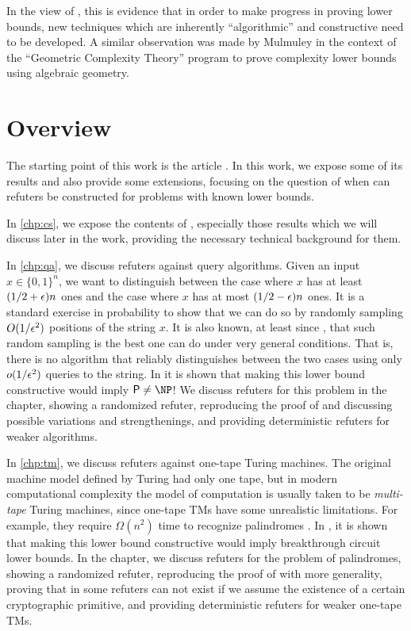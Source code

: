 In the view of \cite{ConstructiveSeparations}, this is evidence that in order to make progress
in proving lower bounds, new techniques which are inherently ``algorithmic'' 
and constructive need to be developed. A similar observation was made by Mulmuley 
\cite{Mulmuley10} in the context of the ``Geometric Complexity Theory'' program 
to prove complexity lower bounds using algebraic geometry. 

\section{Overview}

The starting point of this work is the article \cite{ConstructiveSeparations}. In this work,
we expose some of its results and also provide some extensions, focusing on the question of
when can refuters be constructed for problems with known lower bounds.

In \cref{chp:cs}, we expose the contents of \cite{ConstructiveSeparations}, especially those
results which we will discuss later in the work, providing the necessary technical background 
for them. 

In \cref{chp:qa}, we discuss refuters against query algorithms. 
Given an input $x \in \{0, 1\}^n$, we want to distinguish between the case where $x$ has at
least $(1/2 + \epsilon)n$ ones and the case where $x$ has at most $(1/2 - \epsilon)n$ ones. 
It is a standard exercise in probability to show that we can do so by randomly sampling $O(1/\epsilon^2)$
positions of the string $x$. It is also known, at least since \cite{Canetti95}, that such
random sampling is the best one can do under very general conditions. That is, there is no
algorithm that reliably distinguishes between the two cases using only $o(1/\epsilon^2)$ queries
to the string. In \cite{ConstructiveSeparations} it is shown that making this lower bound
constructive would imply $\PTIME \neq \NP$! We discuss refuters for this
problem in the chapter, showing a 
randomized refuter, reproducing the proof of \cite{ConstructiveSeparations} and discussing
possible variations and strengthenings, and providing deterministic refuters for weaker algorithms. 

In \cref{chp:tm}, we discuss refuters against one-tape Turing machines. 
The original machine model defined by Turing \cite{Turing36} had only one tape, 
but in modern computational complexity the model of computation is usually taken
to be \emph{multi-tape} Turing machines, since one-tape TMs have some 
unrealistic limitations.
For example, they require $\Omega(n^2)$ time to recognize palindromes \cite{Hennie65}. 
In \cite{ConstructiveSeparations}, it is shown that making this lower bound constructive
would imply breakthrough circuit lower bounds. In the chapter, we discuss refuters
for the problem of palindromes, showing a randomized refuter, reproducing the proof of 
\cite{ConstructiveSeparations} with more generality, proving that in some refuters 
can not exist if we assume the existence of a certain cryptographic primitive, 
and providing deterministic refuters for weaker one-tape TMs. 


